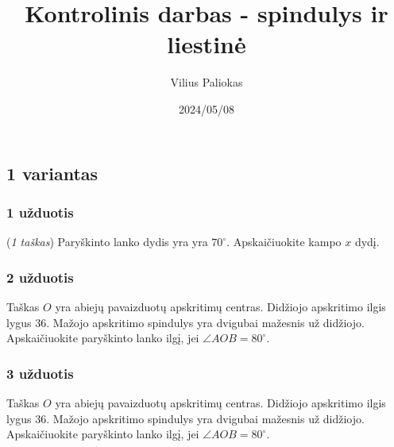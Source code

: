 \documentclass[a4paper]{article}
\title{Kontrolinis darbas - spindulys ir liestinė}
\author{Vilius Paliokas}
\date{2024/05/08}
\begin{document}
\newcommand\blankpage{%
      \null
      \thispagestyle{empty}%
      \addtocounter{page}{-1}%
      \newpage
}

\thispagestyle{fancy}

\subsection*{1 variantas}
\vspace*{5mm}

\subsubsection*{1 užduotis}

\begin{minipage}[t]{0.28\textwidth}
      \centering
\end{minipage}\hfill
\begin{minipage}{0.69\textwidth}

      (\textit{1 taškas}) Paryškinto lanko dydis yra yra $70^\circ$.
      Apskaičiuokite kampo $x$
      dydį.
\end{minipage}

\subsubsection*{2 užduotis}

\begin{minipage}[t]{0.28\textwidth}
      \centering
\end{minipage}\hfill
\begin{minipage}{0.69\textwidth}
      Taškas $O$ yra abiejų pavaizduotų apskritimų centras. Didžiojo
      apskritimo ilgis lygus $36$. Mažojo apskritimo spindulys yra
      dvigubai mažesnis už didžiojo. Apskaičiuokite paryškinto
      lanko ilgį, jei $\angle AOB = 80^\circ$.
\end{minipage}

\subsubsection*{3 užduotis}

\begin{minipage}[t]{0.28\textwidth}
      \centering
\end{minipage}\hfill
\begin{minipage}{0.69\textwidth}
      Taškas $O$ yra abiejų pavaizduotų apskritimų centras. Didžiojo
      apskritimo ilgis lygus $36$. Mažojo apskritimo spindulys yra
      dvigubai mažesnis už didžiojo. Apskaičiuokite paryškinto
      lanko ilgį, jei $\angle AOB = 80^\circ$.
\end{minipage}
\end{document}
